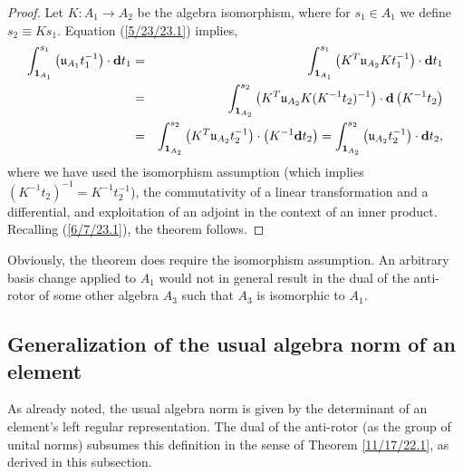 \documentclass{amsart}
\theoremstyle{definition}
\numberwithin{theorem}{section}
\numberwithin{equation}{section}
\begin{document}
\begin{proof} Let $K:A_1\rightarrow A_2$ be the algebra isomorphism, where for $s_1\in A_1$ we define $s_2\equiv Ks_1$. 
Equation (\ref{5/23/23.1}) implies,
\begin{eqnarray}\nonumber \int_{{\bf 1}_{A_1}}^{s_1} \left(\mathfrak{u}_{A_1}t_1^{-1}\right)\cdot \mathbf{d}t_1 &=& \int_{{\bf 1}_{A_1}}^{s_1} \left( K^T\mathfrak{u}_{A_2}Kt_1^{-1}\right)\cdot \mathbf{d}t_1 \\ \nonumber &=& 
\int_{{\bf 1}_{A_2}}^{s_2} \left( K^T\mathfrak{u}_{A_2}K (K^{-1}t_2)^{-1}\right)\cdot \mathbf{d}\left(K^{-1}t_2\right) \\ &=& \int_{{\bf 1}_{A_2}}^{s_2} \left(K^T\mathfrak{u}_{A_2}t_2^{-1}\right)\cdot \left(K^{-1}\mathbf{d}t_2\right) = \int_{{\bf 1}_{A_2}}^{s_2} \left(\mathfrak{u}_{A_2}t_2^{-1}\right)\cdot \mathbf{d}t_2, \label{9/6/24.2}
\end{eqnarray} 
where we have used the isomorphism assumption (which implies $(K^{-1}t_2)^{-1} = K^{-1}t_2^{-1}$), the commutativity of a linear transformation and a differential, and exploitation of an adjoint in the context of an inner product.  Recalling (\ref{6/7/23.1}), the theorem follows.
\end{proof}

Obviously, the theorem does require the isomorphism assumption.  An arbitrary basis change applied to $A_1$ would not in general result in the dual of the anti-rotor of some other algebra $A_3$ such that $A_3$ is isomorphic to $A_1$.

\subsection{Generalization of the usual algebra norm of an element}
As already noted, the usual algebra norm is given by the determinant of an element's left regular representation.  The dual of the anti-rotor (as the group of unital norms) subsumes this definition in the sense of Theorem \ref{11/17/22.1}, as derived in this subsection.  
  
\end{document}
